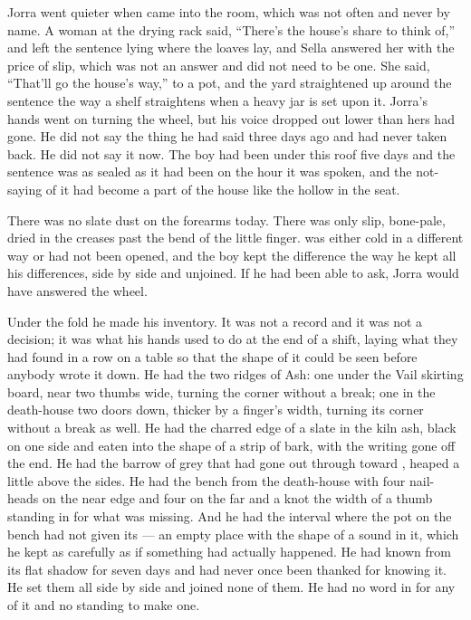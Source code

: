 Jorra went quieter when  came into the room, which was not often and never by name. A woman at the drying rack said, “There's the house's share to think of,” and left the sentence lying where the loaves lay, and Sella answered her with the price of slip, which was not an answer and did not need to be one. She said, “That'll go the house's way,” to a pot, and the yard straightened up around the sentence the way a shelf straightens when a heavy jar is set upon it. Jorra's hands went on turning the wheel, but his voice dropped out lower than hers had gone. He did not say the thing he had said three days ago and had never taken back. He did not say it now. The boy had been under this roof five days and the sentence was as sealed as it had been on the hour it was spoken, and the not-saying of it had become a part of the house like the hollow in the seat.

There was no slate dust on the forearms today. There was only slip, bone-pale, dried in the creases past the bend of the little finger.  was either cold in a different way or had not been opened, and the boy kept the difference the way he kept all his differences, side by side and unjoined. If he had been able to ask, Jorra would have answered the wheel.

Under the fold he made his inventory. It was not a record and it was not a decision; it was what his hands used to do at the end of a shift, laying what they had found in a row on a table so that the shape of it could be seen before anybody wrote it down. He had the two ridges of Ash: one under the Vail skirting board, near two thumbs wide, turning the corner without a break; one in the death-house two doors down, thicker by a finger's width, turning its corner without a break as well. He had the charred edge of a slate in the kiln ash, black on one side and eaten into the shape of a strip of bark, with the writing gone off the end. He had the barrow of grey that had gone out through  toward , heaped a little above the sides. He had the bench from the death-house with four nail-heads on the near edge and four on the far and a knot the width of a thumb standing in for what was missing. And he had the interval where the pot on the bench had not given its  --- an empty place with the shape of a sound in it, which he kept as carefully as if something had actually happened. He had known  from its flat shadow for seven days and had never once been thanked for knowing it. He set them all side by side and joined none of them. He had no word in  for any of it and no standing to make one.

